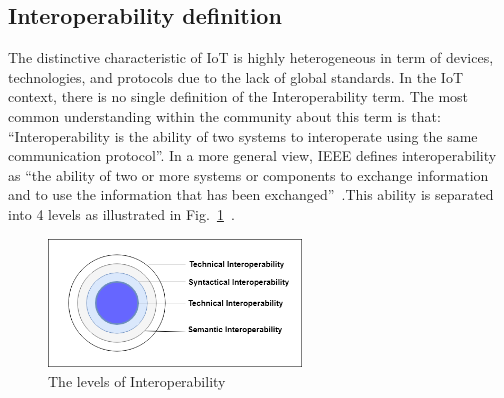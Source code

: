 \subsection{Interoperability definition}

The distinctive characteristic of IoT is highly heterogeneous in term of devices, technologies, and protocols due to the lack of global standards.
In the IoT context, there is no single definition of the Interoperability term. The most common understanding within the community about this term is that: ``Interoperability is the ability of two systems to interoperate using the same communication protocol''. In a more general view, IEEE defines interoperability as ``the ability of two or more systems or components to exchange information and to use the information that has been exchanged''~\cite{radatz1990ieee}.This ability is separated into 4 levels as illustrated in Fig.~\ref{fig:c2_semantic_interperation_levels}~\cite{morse2004findings}. 

\begin{figure}[h!] 
 \begin{center} 
 \includegraphics[width=0.6\textwidth]{./Part1/Chapter2/figures/c2_semantic_interperation_levels.png} 
    \caption{The levels of Interoperability}
     \label{fig:c2_semantic_interperation_levels}
  \end{center} 
\end{figure}

